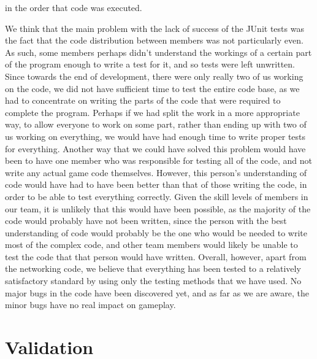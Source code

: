 in the order that code was executed.

We think that the main problem with the lack of success of the JUnit tests was the fact that the code distribution between members was not particularly even. As such, some members perhaps didn't understand the workings of a certain part of the program enough to write a test for it, and so tests were left unwritten. Since towards the end of development, there were only really two of us working on the code, we did not have sufficient time to test the entire code base, as we had to concentrate on writing the parts of the code that were required to complete the program. Perhaps if we had split the work in a more appropriate way, to allow everyone to work on some part, rather than ending up with two of us working on everything, we would have had enough time to write proper tests for everything. Another way that we could have solved this problem would have been to have one member who was responsible for testing all of the code, and not write any actual game code themselves. However, this person's understanding of code would have had to have been better than that of those writing the code, in order to be able to test everything correctly. Given the skill levels of members in our team, it is unlikely that this would have been possible, as the majority of the code would probably have not been written, since the person with the best understanding of code would probably be the one who would be needed to write most of the complex code, and other team members would likely be unable to test the code that that person would have written. Overall, however, apart from the networking code, we believe that everything has been tested to a relatively satisfactory standard by using only the testing methods that we have used. No major bugs in the code have been discovered yet, and as far as we are aware, the minor bugs have no real impact on gameplay.
\section{Validation}